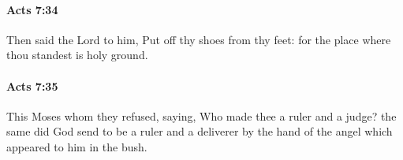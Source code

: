 		\paragraph{Acts 7:34} %
			\label{ACTS-7-34}

			Then said the Lord to him, Put off thy shoes from thy feet: for the place where thou standest is holy ground.

			\begin{framed}
			\scriptsize
				\begin{compactdesc}
					\item[SBLG] 
				\end{compactdesc}
			\end{framed}

		\paragraph{Acts 7:35} %
			\label{ACTS-7-35}

			This Moses whom they refused, saying, Who made thee a ruler and a judge?  the same did God send to be a ruler and a deliverer by the hand of the angel which appeared to him in the bush.

